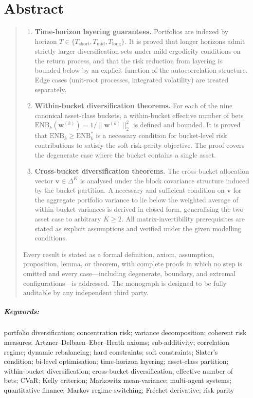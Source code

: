 \documentclass[12pt,openany]{book}
\numberwithin{equation}{chapter}
\theoremstyle{plain}
\theoremstyle{definition}
\theoremstyle{remark}
\newenvironment{abstract}{%
  \chapter*{Abstract}
  \begin{quote}\small
}{%
  \end{quote}
}
\newenvironment{keywords}{%
  \paragraph*{Keywords:}
}{}
\begin{document}
\begin{abstract}
\begin{enumerate}[label=\textbf{\arabic*.}, leftmargin=2em,
                  itemsep=3pt, parsep=0pt, topsep=4pt]
  \item \textbf{Time-horizon layering guarantees.}\enspace
        Portfolios are indexed by horizon $T\in\{T_{\mathrm{short}},
        T_{\mathrm{mid}},T_{\mathrm{long}}\}$.  It is proved that
        longer horizons admit strictly larger diversification sets
        under mild ergodicity conditions on the return process,
        and that the risk reduction from layering is bounded below
        by an explicit function of the autocorrelation structure.
        Edge cases (unit-root processes, integrated volatility) are
        treated separately.

  \item \textbf{Within-bucket diversification theorems.}\enspace
        For each of the nine canonical asset-class buckets, a
        within-bucket effective number of bets
        $\mathrm{ENB}_{k}(\mathbf{w}^{(k)})=
        1/\|\mathbf{w}^{(k)}\|_{2}^{2}$ is defined and bounded.
        It is proved that $\mathrm{ENB}_{k}\geq\mathrm{ENB}^{*}_{k}$
        is a necessary condition for bucket-level risk contributions
        to satisfy the soft risk-parity objective.  The proof covers
        the degenerate case where the bucket contains a single asset.

  \item \textbf{Cross-bucket diversification theorems.}\enspace
        The cross-bucket allocation vector
        $\mathbf{v}\in\Delta^{K}$ is analysed under the block
        covariance structure induced by the bucket partition.  A
        necessary and sufficient condition on $\mathbf{v}$ for the
        aggregate portfolio variance to lie below the weighted
        average of within-bucket variances is derived in closed form,
        generalising the two-asset case to arbitrary $K\geq 2$.
        All matrix-invertibility prerequisites are stated as
        explicit assumptions and verified under the given modelling
        conditions.

\end{enumerate}

\medskip
\noindent
Every result is stated as a formal definition, axiom, assumption,
proposition, lemma, or theorem, with complete proofs in which no
step is omitted and every case---including degenerate, boundary, and
extremal configurations---is addressed.  The monograph is designed
to be fully auditable by any independent third party.
\end{abstract}

\begin{keywords}
portfolio diversification; concentration risk; variance decomposition;
coherent risk measures; Artzner--Delbaen--Eber--Heath axioms;
sub-additivity; correlation regime; dynamic rebalancing;
hard constraints; soft constraints; Slater's condition; bi-level
optimisation; time-horizon layering; asset-class partition;
within-bucket diversification; cross-bucket diversification;
effective number of bets; CVaR; Kelly criterion;
Markowitz mean-variance; multi-agent systems; quantitative finance;
Markov regime-switching; Fr\'{e}chet derivative; risk parity
\end{keywords}
\end{document}

